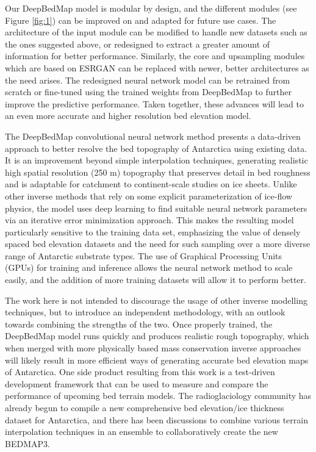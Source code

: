 \documentclass[tc, manuscript]{copernicus}
\begin{document}
Our DeepBedMap model is modular by design, and the different modules (see Figure \ref{fig:1}) can be improved on and adapted for future use cases.
The architecture of the input module can be modified to handle new datasets such as the ones suggested above, or redesigned to extract a greater amount of information for better performance.
Similarly, the core and upsampling modules which are based on ESRGAN \citep{WangESRGANEnhancedSuperResolution2018} can be replaced with newer, better architectures as the need arises.
The redesigned neural network model can be retrained from scratch or fine-tuned using the trained weights from DeepBedMap to further improve the predictive performance.
Taken together, these advances will lead to an even more accurate and higher resolution bed elevation model.


\conclusions  %

The DeepBedMap convolutional neural network method presents a data-driven approach to better resolve the bed topography of Antarctica using existing data.
It is an improvement beyond simple interpolation techniques, generating realistic high spatial resolution (250 m) topography that preserves detail in bed roughness and is adaptable for catchment to continent-scale studies on ice sheets.
Unlike other inverse methods that rely on some explicit parameterization of ice-flow physics, the model uses deep learning to find suitable neural network parameters via an iterative error minimization approach.
This makes the resulting model particularly sensitive to the training data set, emphasizing the value of densely spaced bed elevation datasets and the need for such sampling over a more diverse range of Antarctic substrate types.
The use of Graphical Processing Units (GPUs) for training and inference allows the neural network method to scale easily, and the addition of more training datasets will allow it to perform better.

The work here is not intended to discourage the usage of other inverse modelling techniques, but to introduce an independent methodology, with an outlook towards combining the strengths of the two.
Once properly trained, the DeepBedMap model runs quickly and produces realistic rough topography, which when merged with more physically based mass conservation inverse approaches \citep[e.g.][]{MorlighemDeepglacialtroughs2019} will likely result in more efficient ways of generating accurate bed elevation maps of Antarctica.
One side product resulting from this work is a test-driven development framework that can be used to measure and compare the performance of upcoming bed terrain models.
The radioglaciology community has already begun to compile a new comprehensive bed elevation/ice thickness dataset for Antarctica, and there has been discussions to combine various terrain interpolation techniques in an ensemble to collaboratively create the new BEDMAP3.
\end{document}
